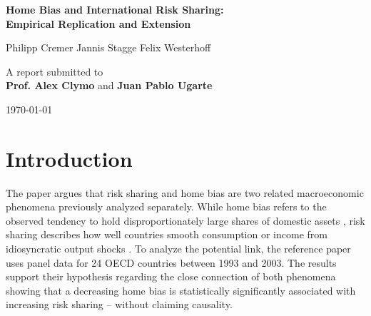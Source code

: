 \documentclass[11pt,a4paper]{article}
\begin{document}
\begin{titlepage}
    \centering
    \vspace*{3cm} %

    {\Huge \bfseries Home Bias and International Risk Sharing:\\[0.5em]
    Empirical Replication and Extension\par}
    
    \vspace{2.5cm} %
    
    {\Large Philipp Cremer \quad Jannis Stagge \quad Felix Westerhoff\par}
    
    \vspace{2.5cm} %
    
    {\large A report submitted to\\[0.5em]
    \textbf{Prof. Alex Clymo} and \textbf{Juan Pablo Ugarte}\par}
    
    \vfill %
    
    {\large \today\par}
\end{titlepage}


\newpage

\tableofcontents
\thispagestyle{empty}
\newpage
\setcounter{page}{1}
\section{Introduction}\label{sec:introduction}

The paper \textcite{main} argues that risk sharing and home bias are two related macroeconomic phenomena previously analyzed separately. While home bias refers to the observed tendency to hold disproportionately large shares of domestic assets \parencite[see also]{FrenchPoterba1991}, risk sharing describes how well countries smooth consumption or income from idiosyncratic output shocks \parencite[see also]{Obstfeld1994}. To analyze the potential link, the reference paper uses panel data for 24 OECD countries between 1993 and 2003. The results support their
hypothesis regarding the close connection of both phenomena showing that a decreasing home bias is statistically significantly associated with increasing risk sharing -- without claiming causality.\\
\end{document}
